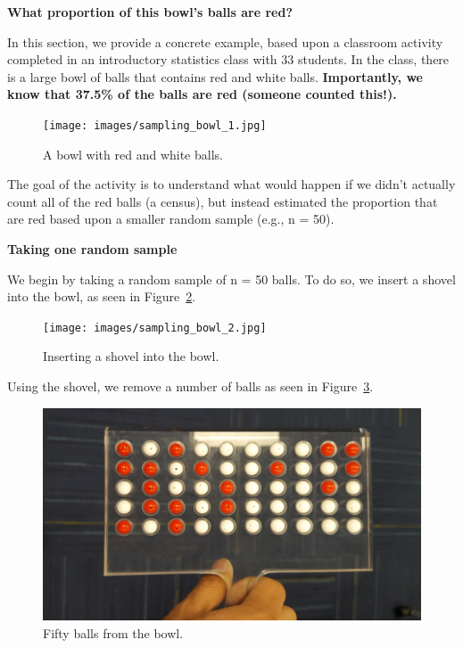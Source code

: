 \documentclass[
  letterpaper,
  DIV=11,
  numbers=noendperiod]{scrreprt}
\theoremstyle{definition}
\theoremstyle{remark}
\begin{document}
\textbf{What proportion of this bowl's balls are red?}

In this section, we provide a concrete example, based upon a classroom
activity completed in an introductory statistics class with 33 students.
In the class, there is a large bowl of balls that contains red and white
balls. \textbf{Importantly, we know that 37.5\% of the balls are red
(someone counted this!).}

\begin{figure}

{\centering \texttt{[image: images/sampling\_bowl\_1.jpg]}

}

\caption{\label{fig-sampling-exercise-1}A bowl with red and white
balls.}

\end{figure}

The goal of the activity is to understand what would happen if we didn't
actually count all of the red balls (a census), but instead estimated
the proportion that are red based upon a smaller random sample (e.g., n
= 50).

\textbf{Taking one random sample}

We begin by taking a random sample of n = 50 balls. To do so, we insert
a shovel into the bowl, as seen in Figure~\ref{fig-sampling-exercise-2}.

\begin{figure}

{\centering \texttt{[image: images/sampling\_bowl\_2.jpg]}

}

\caption{\label{fig-sampling-exercise-2}Inserting a shovel into the
bowl.}

\end{figure}

Using the shovel, we remove a number of balls as seen in
Figure~\ref{fig-sampling-exercise-3}.

\begin{figure}

{\centering \includegraphics{images/sampling_bowl_3_cropped.jpg}

}

\caption{\label{fig-sampling-exercise-3}Fifty balls from the bowl.}

\end{figure}
\end{document}
